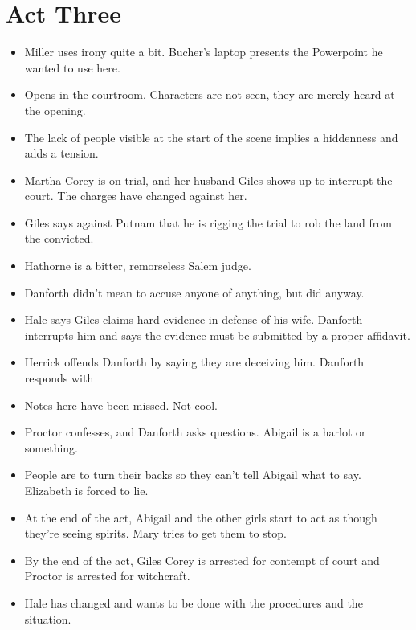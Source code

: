 \documentclass[10pt]{article}
\begin{document}
\section{Act Three}
\begin{itemize}
	\item Miller uses irony quite a bit.  Bucher's laptop presents the 
		Powerpoint he wanted to use here.
	\item Opens in the courtroom.  Characters are not seen, they are
		merely heard at the opening.
	\item The lack of people visible at the start of the scene implies a
		hiddenness and adds a tension.
	\item Martha Corey is on trial, and her husband Giles shows up to
		interrupt the court.  The charges have changed against her. 
	\item Giles says against Putnam that he is rigging the trial to rob
		the land from the convicted.
	\item Hathorne is a bitter, remorseless Salem judge.  
	\item Danforth didn't mean to accuse anyone of anything, but did 
		anyway.
	\item Hale says Giles claims hard evidence in defense of his wife.
		Danforth interrupts him and says the evidence must be submitted by
		a proper affidavit.
	\item Herrick offends Danforth by saying they are deceiving him.
		Danforth responds with 
	\item Notes here have been missed.  Not cool.
	\item Proctor confesses, and Danforth asks questions.  Abigail is a
		harlot or something.
	\item People are to turn their backs so they can't tell Abigail what to
		say.  Elizabeth is forced to lie.
	\item At the end of the act, Abigail and the other girls start to act 
		as though they're seeing spirits.  Mary tries to get them to stop.
	\item By the end of the act, Giles Corey is arrested for contempt of
		court and Proctor is arrested for witchcraft.
	\item Hale has changed and wants to be done with the procedures and
		the situation.
\end{itemize}
\end{document}
